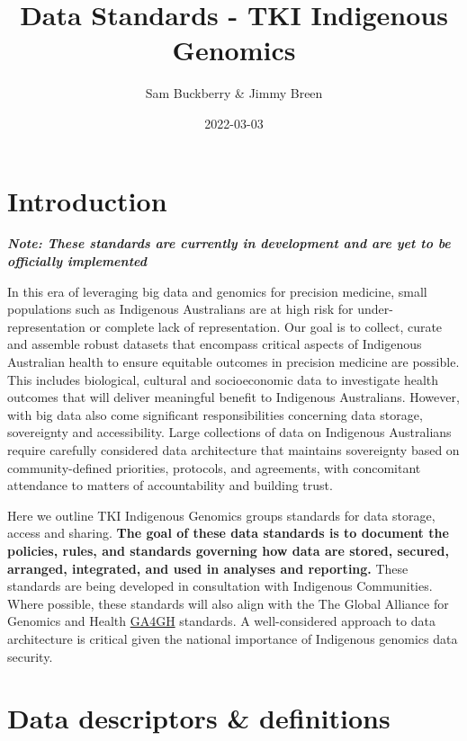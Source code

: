\documentclass[
]{book}
\title{Data Standards - TKI Indigenous Genomics}
\author{Sam Buckberry \& Jimmy Breen}
\date{2022-03-03}
\begin{document}
\maketitle

{
\setcounter{tocdepth}{1}
\tableofcontents
}
\hypertarget{introduction}{%
\chapter{Introduction}\label{introduction}}

\textbf{\emph{Note: These standards are currently in development and are yet to be officially implemented}}

In this era of leveraging big data and genomics for precision medicine, small populations such as Indigenous Australians are at high risk for under-representation or complete lack of representation. Our goal is to collect, curate and assemble robust datasets that encompass critical aspects of Indigenous Australian health to ensure equitable outcomes in precision medicine are possible. This includes biological, cultural and socioeconomic data to investigate health outcomes that will deliver meaningful benefit to Indigenous Australians. However, with big data also come significant responsibilities concerning data storage, sovereignty and accessibility. Large collections of data on Indigenous Australians require carefully considered data architecture that maintains sovereignty based on community-defined priorities, protocols, and agreements, with concomitant attendance to matters of accountability and building trust.

Here we outline TKI Indigenous Genomics groups standards for data storage, access and sharing. \textbf{The goal of these data standards is to document the policies, rules, and standards governing how data are stored, secured, arranged, integrated, and used in analyses and reporting.} These standards are being developed in consultation with Indigenous Communities. Where possible, these standards will also align with the The Global Alliance for Genomics and Health \href{https://www.ga4gh.org/}{GA4GH} standards. A well-considered approach to data architecture is critical given the national importance of Indigenous genomics data security.

\hypertarget{data-descriptors-definitions}{%
\chapter{Data descriptors \& definitions}\label{data-descriptors-definitions}}
\end{document}
